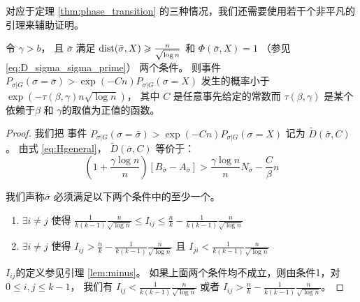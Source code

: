   对应于定理 \ref{thm:phase_transition}  的三种情况，我们还需要使用若干个非平凡的引理来辅助证明。

  \begin{lemma}\label{lem:sigmaX}
    令 $\gamma > b$， 且 $\bar{\sigma}$ 满足 $\operatorname{dist}(\bar{\sigma}, X) \geqslant \frac{n}{\sqrt{\log n}}$
    和 $\Phi(\bar{\sigma}, X)=1$
    （参见\eqref{eq:D_sigma_sigma_prime}）
    两个条件。
    则事件
    $P_{\sigma | G}(\sigma = \bar{\sigma} ) > \exp(-Cn) P_{\sigma | G}(\sigma = X)$
    发生的概率小于 $\exp(-\tau(\beta, \gamma) n \sqrt{\log  n} )$，
    其中 $C$ 是任意事先给定的常数而 
    $\tau(\beta, \gamma)$
   是某个依赖于$\beta$ 和 $\gamma$的取值为正值的函数。
  \end{lemma}
  \begin{proof}
    我们把 事件 $P_{\sigma | G}(\sigma = \bar{\sigma} ) > \exp(-Cn) P_{\sigma | G}(\sigma = X)$
    记为 $\widetilde{D}(\bar{\sigma}, C)$。
    由式 \eqref{eq:Hgeneral}， $\widetilde{D}(\bar{\sigma}, C)$
    等价于：
  \begin{equation}\label{eq:BwA}
    \left(1 + \frac{\gamma \log n}{n} \right)
    [B_{\bar{\sigma}} - A_{\bar{\sigma}}] >  \frac{\gamma \log n}{n} N_{\bar{\sigma}}  - \frac{C}{\beta} n
    \end{equation}  
    
    我们声称$\bar{\sigma}$  必须满足以下两个条件中的至少一个。
    \begin{enumerate}
      \item $\exists i\neq j$ 使得 $\frac{1}{k(k-1)}\frac{n}{\sqrt{\log n}} \leq I_{ij} \leq \frac{n}{k} - \frac{1}{k(k-1)}\frac{n}{\sqrt{\log n}}$
      \item $\exists i \neq j$ 使得 $I_{ij} > \frac{n}{k} - \frac{1}{k(k-1)}\frac{n}{\sqrt{\log n}}$ 且 $I_{ji} < \frac{1}{k(k-1)}\frac{n}{\sqrt{\log n}}$
    \end{enumerate}
    $I_{ij}$的定义参见引理
    \ref{lem:minus}。
    如果上面两个条件均不成立，则由条件1，对 $0 \leq i,j\leq k-1$，
    我们有
    $I_{ij} < \frac{1}{k(k-1)}\frac{n}{\sqrt{\log n}}$
    或者 $I_{ij} > \frac{n}{k} - \frac{1}{k(k-1)}\frac{n}{\sqrt{\log n}}$。
    

\end{proof}
